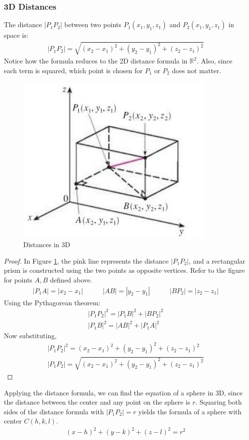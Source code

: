 \documentclass{article}
\begin{document}
\subsubsection{3D Distances}
The distance $|P_1P_2|$ between two points $P_1(x_1,y_1,z_1)$ and $P_2(x_1,y_1,z_1)$ in space is:
\begin{gather*}
    |P_1P_2| = \sqrt{(x_2-x_1)^2+(y_2-y_1)^2+(z_2-z_1)^2}
\end{gather*}
Notice how the formula reduces to the 2D distance formula in $\mathbb{R}^2$. Also, since each term is squared, which point is chosen for $P_1$ or $P_2$ does not matter.
\begin{figure}[H]
\begin{center}
\includegraphics[scale=0.5]{3D-distance.jpg}
\caption{Distances in 3D}
\label{dist}
\end{center}
\end{figure}
\begin{proof}
In Figure \ref{dist}, the pink line represents the distance $|P_1P_2|$, and a rectangular prism is constructed using the two points as opposite vertices. Refer to the figure for points $A,B$ defined above.
\begin{gather*}
    |P_1A| = |x_2-x_1|\hspace{35pt}|AB| = |y_2-y_1|\hspace{35pt}|BP_2| = |z_2-z_1|
\end{gather*}
Using the Pythagorean theorem:
\begin{gather*}
    |P_1P_2|^2 = |P_1B|^2 + |BP_2|^2\\
    |P_1B|^2 = |AB|^2 + |P_1A|^2
\end{gather*}
Now substituting,
\begin{gather*}
    |P_1P_2|^2 = (x_2-x_1)^2+(y_2-y_1)^2+(z_2-z_1)^2\\
    |P_1P_2| = \sqrt{(x_2-x_1)^2+(y_2-y_1)^2+(z_2-z_1)^2}
\end{gather*}
\end{proof}
Applying the distance formula, we can find the equation of a sphere in 3D, since the distance between the center and any point on the sphere is $r$. Squaring both sides of the distance formula with $|P_1P_2| = r$ yields the formula of a sphere with center $C(h,k,l)$.
\begin{gather*}
    (x-h)^2 + (y-k)^2 + (z-l)^2 = r^2
\end{gather*}
\end{document}
